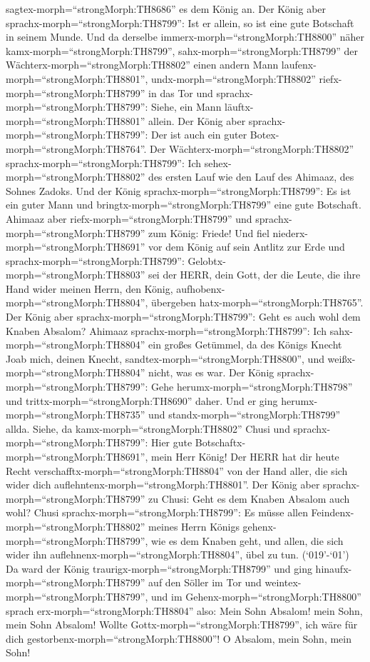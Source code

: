 sagtex-morph=``strongMorph:TH8686'' es dem König an. Der König aber
sprachx-morph=``strongMorph:TH8799'': Ist er allein, so ist eine gute
Botschaft in seinem Munde. Und da derselbe
immerx-morph=``strongMorph:TH8800'' näher
kamx-morph=``strongMorph:TH8799'', 
sahx-morph=``strongMorph:TH8799'' der
Wächterx-morph=``strongMorph:TH8802'' einen andern Mann
laufenx-morph=``strongMorph:TH8801'', undx-morph=``strongMorph:TH8802''
riefx-morph=``strongMorph:TH8799'' in das Tor und
sprachx-morph=``strongMorph:TH8799'': Siehe, ein Mann
läuftx-morph=``strongMorph:TH8801'' allein. Der König aber
sprachx-morph=``strongMorph:TH8799'': Der ist auch ein guter
Botex-morph=``strongMorph:TH8764''.  Der
Wächterx-morph=``strongMorph:TH8802''
sprachx-morph=``strongMorph:TH8799'': Ich
sehex-morph=``strongMorph:TH8802'' des ersten Lauf wie den Lauf des
Ahimaaz, des Sohnes Zadoks. Und der König
sprachx-morph=``strongMorph:TH8799'': Es ist ein guter Mann und
bringtx-morph=``strongMorph:TH8799'' eine gute Botschaft. 
Ahimaaz aber riefx-morph=``strongMorph:TH8799'' und
sprachx-morph=``strongMorph:TH8799'' zum König: Friede! Und fiel
niederx-morph=``strongMorph:TH8691'' vor dem König auf sein Antlitz zur
Erde und sprachx-morph=``strongMorph:TH8799'':
Gelobtx-morph=``strongMorph:TH8803'' sei der HERR, dein Gott, der die
Leute, die ihre Hand wider meinen Herrn, den König,
aufhobenx-morph=``strongMorph:TH8804'', übergeben
hatx-morph=``strongMorph:TH8765''.  Der König aber
sprachx-morph=``strongMorph:TH8799'': Geht es auch wohl dem Knaben
Absalom? Ahimaaz sprachx-morph=``strongMorph:TH8799'': Ich
sahx-morph=``strongMorph:TH8804'' ein großes Getümmel, da des Königs
Knecht Joab mich, deinen Knecht, sandtex-morph=``strongMorph:TH8800'',
und weißx-morph=``strongMorph:TH8804'' nicht, was es war. 
Der König sprachx-morph=``strongMorph:TH8799'': Gehe
herumx-morph=``strongMorph:TH8798'' und
trittx-morph=``strongMorph:TH8690'' daher. Und er ging
herumx-morph=``strongMorph:TH8735'' und
standx-morph=``strongMorph:TH8799'' allda.  Siehe, da
kamx-morph=``strongMorph:TH8802'' Chusi und
sprachx-morph=``strongMorph:TH8799'': Hier gute
Botschaftx-morph=``strongMorph:TH8691'', mein Herr König! Der HERR hat
dir heute Recht verschafftx-morph=``strongMorph:TH8804'' von der Hand
aller, die sich wider dich auflehntenx-morph=``strongMorph:TH8801''.
 Der König aber sprachx-morph=``strongMorph:TH8799'' zu
Chusi: Geht es dem Knaben Absalom auch wohl? Chusi
sprachx-morph=``strongMorph:TH8799'': Es müsse allen
Feindenx-morph=``strongMorph:TH8802'' meines Herrn Königs
gehenx-morph=``strongMorph:TH8799'', wie es dem Knaben geht, und allen,
die sich wider ihn auflehnenx-morph=``strongMorph:TH8804'', übel zu tun.
 (`019'-`01') Da ward der König
traurigx-morph=``strongMorph:TH8799'' und ging
hinaufx-morph=``strongMorph:TH8799'' auf den Söller im Tor und
weintex-morph=``strongMorph:TH8799'', und im
Gehenx-morph=``strongMorph:TH8800'' sprach
erx-morph=``strongMorph:TH8804'' also: Mein Sohn Absalom! mein Sohn,
mein Sohn Absalom! Wollte Gottx-morph=``strongMorph:TH8799'', ich wäre
für dich gestorbenx-morph=``strongMorph:TH8800''! O Absalom, mein Sohn,
mein Sohn!

